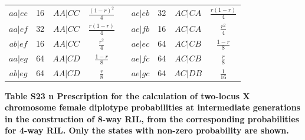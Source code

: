 \documentclass[9pt,letterpaper,twoside]{article}
\begin{document}
{\begin{center}
\begin{tabular}{ccccccccc}
$aa|ee$ & 16 & $AA|CC$ & $\frac{(1-r)^2}{4}$ &&
$ae|eb$ & 32 & $AC|CA$ & $\frac{r(1-r)}{4}$ \\ 
$aa|ef$ & 32 & $AA|CC$ & $\frac{r(1-r)}{4}$ &&
$ae|fb$ & 16 & $AC|CA$ & $\frac{r^2}{4}$ \\ 
$ab|ef$ & 16 & $AA|CC$ & $\frac{r^2}{4}$ &&
$ae|ec$ & 64 & $AC|CB$ & $\frac{1-r}{8}$ \\ 
$aa|eg$ & 64 & $AA|CD$ & $\frac{1-r}{8}$ &&
$ae|fc$ & 64 & $AC|CB$ & $\frac{r}{8}$ \\ 
$ab|eg$ & 64 & $AA|CD$ & $\frac{r}{8}$ &&
$ae|gc$ & 64 & $AC|DB$ & $\frac{1}{16}$ \\ 
\cline{6-9}
\cline{1-4} \cline{6-9} 
\end{tabular} \end{center}
}
\newpage

\noindent \textbf{Table S23 {\color{white} n} Prescription for the calculation of two-locus X
chromosome female diplotype probabilities at intermediate generations
in the construction of 8-way RIL, from the corresponding probabilities
for 4-way RIL. Only the states with non-zero probability are shown.}

\bigskip
\end{document}
